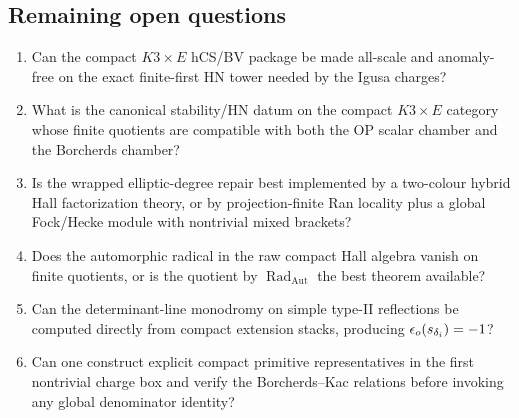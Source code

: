 \subsection{Remaining open questions}

\begin{enumerate}
\item Can the compact \(K3\times E\) hCS/BV package be made all-scale and
anomaly-free on the exact finite-first HN tower needed by the Igusa charges?
\item What is the canonical stability/HN datum on the compact
\(K3\times E\) category whose finite quotients are compatible with both
the OP scalar chamber and the Borcherds chamber?
\item Is the wrapped elliptic-degree repair best implemented by a
two-colour hybrid Hall factorization theory, or by projection-finite Ran
locality plus a global Fock/Hecke module with nontrivial mixed brackets?
\item Does the automorphic radical in the raw compact Hall algebra vanish
on finite quotients, or is the quotient by
\(\operatorname{Rad}_{\operatorname{Aut}}\) the best theorem available?
\item Can the determinant-line monodromy on simple type-II reflections be
computed directly from compact extension stacks, producing
\(\epsilon_o(s_{\delta_i})=-1\)?
\item Can one construct explicit compact primitive representatives in the
first nontrivial charge box and verify the Borcherds--Kac relations before
invoking any global denominator identity?
\end{enumerate}
